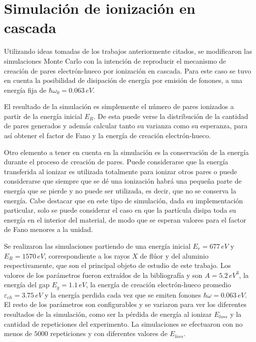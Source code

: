 \section{Simulación de ionización en cascada}
\noindent Utilizando ideas tomadas de los trabajos anteriormente citados, se modificaron las simulaciones Monte Carlo con la intención de reproducir el mecanismo de creación de pares electrón-hueco por ionización en cascada. Para este caso se tuvo en cuenta la posibilidad de disipación de energía por emisión de fonones, a una energía fija de $\hbar\omega_{0} = 0.063\,eV$.

El resultado de la simulación es simplemente el número de pares 
ionizados a partir de la energía inicial $E_{R}$. De esta puede verse la distribución de la cantidad de pares generados y además calcular tanto su varianza como su esperanza, para así obtener el factor de Fano y la energía de creación electrón-hueco.

Otro elemento a tener en cuenta en la simulación es la conservación de la energía durante el proceso de creación de pares. Puede considerarse que la energía transferida al ionizar es utilizada totalmente para ionizar otros pares o puede considerarse que siempre que se dé una ionización habrá una pequeña parte de energía que se pierde y no puede ser utilizada, es decir, que no se conserva la energía. Cabe destacar que en este tipo de simulación, dada su implementación particular, solo se puede considerar el caso en que la partícula disipa toda su energía en el interior del material, de modo que se esperan valores para el factor de Fano menores a la unidad.

Se realizaron las simulaciones partiendo de una energía inicial $E_{r} = 677\,\si{eV}$ y $E_{R} = 1570\,\si{eV}$, correspondiente a los rayos $X$ de flúor y del aluminio respectivamente, que son el principal objeto de estudio de este trabajo. Los valores de los parámetros fueron extraídos de la bibliografía\cite{Alig, Ramanathan} y son $A = 5.2\,\si{eV}^{3}$, la energía del gap $E_{g} = 1.1\,\si{eV}$, la energía de creación electrón-hueco promedio $\varepsilon_{eh} = 3.75\,\si{eV}$ y la energía perdida cada vez que se emiten fonones $\hbar \omega = 0.063\,\si{eV}$. El resto de los parámetros son configurables y se variaron para ver los diferentes resultados de la simulación, como ser la pérdida de energía al ionizar $E_{loss}$ y la cantidad de repeticiones del experimento. La simulaciones se efectuaron con no menos de $5000$ repeticiones y con diferentes valores de $E_{loss}$.

